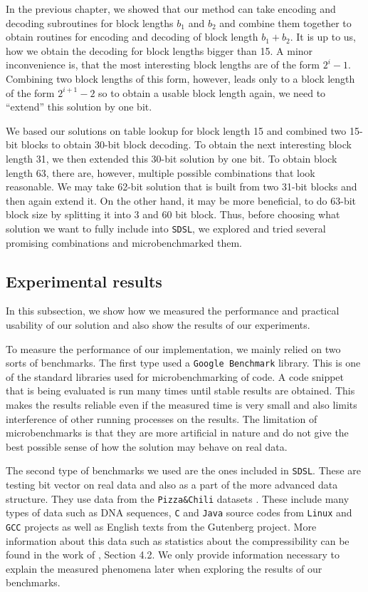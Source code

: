 In the previous chapter, we showed that our method can take encoding and decoding subroutines
for block lengths $b_1$ and $b_2$ and combine them together to obtain routines for encoding and
decoding of block length $b_1+b_2$. It is up to us, how we obtain the decoding for block
lengths bigger than 15. A minor inconvenience is, that the most interesting block lengths are of
the form $2^i-1$. Combining two block lengths of this form, however, leads only to a block length
of the form $2^{i+1}-2$ so to obtain a usable block length again, we need to ``extend'' this solution
by one bit.

We based our solutions on table lookup for block length 15 and combined two 15-bit blocks to obtain
30-bit block decoding. To obtain the next interesting block length 31, we then extended this 30-bit
solution by one bit. To obtain block length 63, there are, however, multiple possible combinations
that look reasonable. We may take 62-bit solution that is built from two 31-bit blocks
and then again extend it. On the other hand, it may be more beneficial, to do 63-bit block size by
splitting it into 3 and 60 bit block. Thus, before choosing what solution we want to fully include
into \texttt{SDSL}, we explored and tried several promising combinations and microbenchmarked them.

\subsection{Experimental results}

In this subsection, we show how we measured the performance and practical usability of our solution
and also show the results of our experiments.

To measure the performance of our implementation, we mainly relied on two sorts of benchmarks.
The first type used a \texttt{Google Benchmark} library. This is one of the standard libraries
used for microbenchmarking of code. A code snippet that is being evaluated is run many times
until stable results are obtained. This makes the results reliable even if the measured time
is very small and also limits interference of other running processes on the results. The
limitation of microbenchmarks is that they are more artificial in nature and
do not give the best possible sense of how the solution may behave on real data.

The second type of benchmarks we used are the ones included in \texttt{SDSL}. These are
testing bit vector on real data and also as a part of the more advanced data structure.
They use data from the \texttt{Pizza\&Chili} datasets \citep{ferragina2005pizza}. These
include many types of data such as DNA sequences, \texttt{C} and \texttt{Java} source codes
from \texttt{Linux} and \texttt{GCC} projects as well as English texts from the Gutenberg
project. More information about this data such as statistics about the compressibility can
be found in the work of \cite{ferragina2009compressed}, Section 4.2. We only provide information
necessary to explain the measured phenomena later when exploring the results of our benchmarks.

